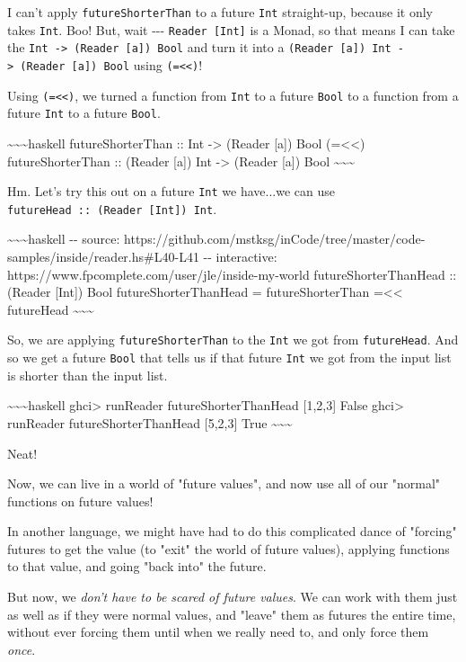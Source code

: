 \documentclass[]{article}
\begin{document}
I can't apply \texttt{futureShorterThan} to a future \texttt{Int} straight-up,
because it only takes \texttt{Int}. Boo! But, wait -\/-\/-
\texttt{Reader\ {[}Int{]}} is a Monad, so that means I can take the
\texttt{Int\ -\textgreater{}\ (Reader\ {[}a{]})\ Bool} and turn it into a
\texttt{(Reader\ {[}a{]})\ Int\ -\textgreater{}\ (Reader\ {[}a{]})\ Bool} using
\texttt{(=\textless{}\textless{})}!

Using \texttt{(=\textless{}\textless{})}, we turned a function from \texttt{Int}
to a future \texttt{Bool} to a function from a future \texttt{Int} to a future
\texttt{Bool}.

\textasciitilde{}\textasciitilde{}\textasciitilde{}haskell futureShorterThan ::
Int -\textgreater{} (Reader {[}a{]}) Bool (=\textless{}\textless{})
futureShorterThan :: (Reader {[}a{]}) Int -\textgreater{} (Reader {[}a{]}) Bool
\textasciitilde{}\textasciitilde{}\textasciitilde{}

Hm. Let's try this out on a future \texttt{Int} we have...we can use
\texttt{futureHead\ ::\ (Reader\ {[}Int{]})\ Int}.

\textasciitilde{}\textasciitilde{}\textasciitilde{}haskell -\/- source:
https://github.com/mstksg/inCode/tree/master/code-samples/inside/reader.hs\#L40-L41
-\/- interactive: https://www.fpcomplete.com/user/jle/inside-my-world
futureShorterThanHead :: (Reader {[}Int{]}) Bool futureShorterThanHead =
futureShorterThan =\textless{}\textless{} futureHead
\textasciitilde{}\textasciitilde{}\textasciitilde{}

So, we are applying \texttt{futureShorterThan} to the \texttt{Int} we got from
\texttt{futureHead}. And so we get a future \texttt{Bool} that tells us if that
future \texttt{Int} we got from the input list is shorter than the input list.

\textasciitilde{}\textasciitilde{}\textasciitilde{}haskell ghci\textgreater{}
runReader futureShorterThanHead {[}1,2,3{]} False ghci\textgreater{} runReader
futureShorterThanHead {[}5,2,3{]} True
\textasciitilde{}\textasciitilde{}\textasciitilde{}

Neat!

Now, we can live in a world of "future values", and now use all of our "normal"
functions on future values!

In another language, we might have had to do this complicated dance of "forcing"
futures to get the value (to "exit" the world of future values), applying
functions to that value, and going "back into" the future.

But now, we \emph{don't have to be scared of future values}. We can work with
them just as well as if they were normal values, and "leave" them as futures the
entire time, without ever forcing them until when we really need to, and only
force them \emph{once}.
\end{document}
